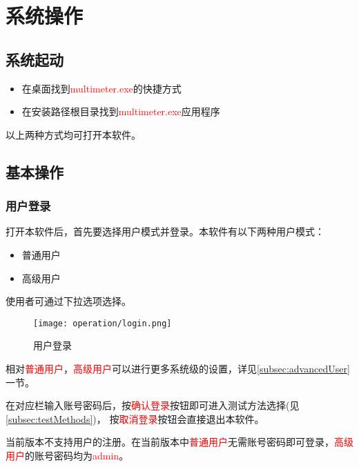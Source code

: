 \chapter{系统操作\label{ch:operation}}
\section{系统起动}
\begin{itemize}
    \item 在桌面找到\textcolor{red}{multimeter.exe}的快捷方式
    \item 在安装路径根目录找到\textcolor{red}{multimeter.exe}应用程序
\end{itemize}
以上两种方式均可打开本软件。
\section{基本操作}
\subsection{用户登录}
打开本软件后，首先要选择用户模式并登录。本软件有以下两种用户模式：
\begin{itemize}
    \item 普通用户
    \item 高级用户
\end{itemize}
使用者可通过下拉选项选择。
\begin{figure}[!h]
    \centering
    \texttt{[image: operation/login.png]}
    \caption{ 用户登录 \label{fig:login}}
\end{figure}
相对\textcolor{red}{普通用户}，\textcolor{red}{高级用户}可以进行更多系统级的设置，详见\ref{subsec:advancedUser}一节。

在对应栏输入账号密码后，按\textcolor{red}{确认登录}按钮即可进入测试方法选择(见\ref{subsec:testMethods})，
按\textcolor{red}{取消登录}按钮会直接退出本软件。
\begin{note}
    当前版本不支持用户的注册。在当前版本中\textcolor{red}{普通用户}无需账号密码即可登录，\textcolor{red}{高级用户}的账号密码均为\textcolor{red}{admin}。
\end{note}
